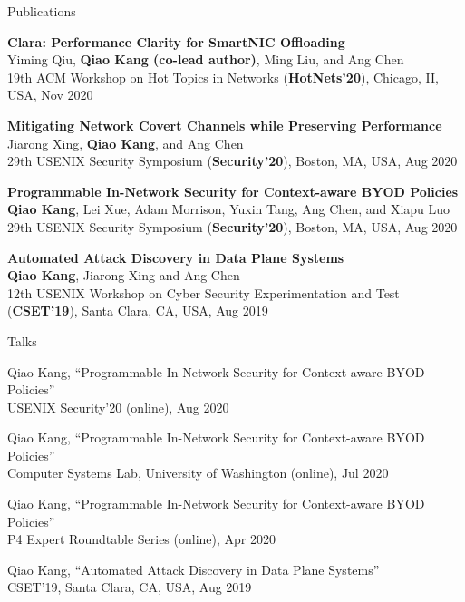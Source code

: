 \documentclass{resume} %
\begin{document}
\begin{rSection}{Publications}

\item {\bf Clara: Performance Clarity for SmartNIC Offloading}\\
Yiming Qiu, {\bf Qiao Kang (co-lead author)}, Ming Liu, and Ang Chen \\
19th ACM Workshop on Hot Topics in Networks ({\bf HotNets'20}), Chicago, II, USA, Nov 2020

\item {\bf Mitigating Network Covert Channels while Preserving Performance}\\
Jiarong Xing, {\bf Qiao Kang}, and Ang Chen\\
29th USENIX Security Symposium ({\bf Security'20}), Boston, MA, USA, Aug 2020

\item {\bf Programmable In-Network Security for Context-aware BYOD Policies}\\
{\bf Qiao Kang}, Lei Xue, Adam Morrison, Yuxin Tang, Ang Chen, and Xiapu Luo\\
29th USENIX Security Symposium ({\bf Security'20}), Boston, MA, USA, Aug 2020

\item {\bf Automated Attack Discovery in Data Plane Systems}\\
{\bf Qiao Kang}, Jiarong Xing and Ang Chen\\
12th USENIX Workshop on Cyber Security Experimentation and Test ({\bf CSET'19}), Santa Clara, CA, USA, Aug 2019

\end{rSection}



\begin{rSection}{Talks}

\item Qiao Kang, ``Programmable In-Network Security for Context-aware BYOD Policies'' \\
USENIX Security'20 (online), Aug 2020

\item Qiao Kang, ``Programmable In-Network Security for Context-aware BYOD Policies'' \\
Computer Systems Lab, University of Washington (online), Jul 2020

\item Qiao Kang, ``Programmable In-Network Security for Context-aware BYOD Policies'' \\
P4 Expert Roundtable Series (online), Apr 2020

\item Qiao Kang, ``Automated Attack Discovery in Data Plane Systems'' \\
CSET'19, Santa Clara, CA, USA, Aug 2019

\end{rSection}
\end{document}
